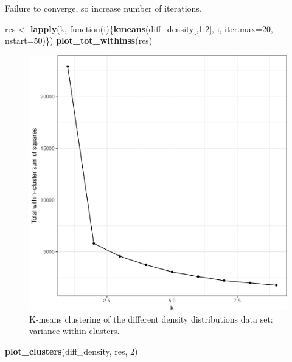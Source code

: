 \documentclass[]{book}
\newenvironment{Shaded}{\begin{snugshade}}{\end{snugshade}}
\newcommand{\KeywordTok}[1]{\textcolor[rgb]{0.13,0.29,0.53}{\textbf{{#1}}}}
\newcommand{\DataTypeTok}[1]{\textcolor[rgb]{0.13,0.29,0.53}{{#1}}}
\newcommand{\DecValTok}[1]{\textcolor[rgb]{0.00,0.00,0.81}{{#1}}}
\newcommand{\StringTok}[1]{\textcolor[rgb]{0.31,0.60,0.02}{{#1}}}
\newcommand{\NormalTok}[1]{{#1}}
\theoremstyle{definition}
\theoremstyle{definition}
\theoremstyle{definition}
\theoremstyle{remark}
\begin{document}
Failure to converge, so increase number of iterations.

\begin{Shaded}
\begin{Highlighting}[]
\NormalTok{res <-}\StringTok{ }\KeywordTok{lapply}\NormalTok{(k, function(i)\{}\KeywordTok{kmeans}\NormalTok{(diff_density[,}\DecValTok{1}\NormalTok{:}\DecValTok{2}\NormalTok{], i, }\DataTypeTok{iter.max=}\DecValTok{20}\NormalTok{, }\DataTypeTok{nstart=}\DecValTok{50}\NormalTok{)\})}
\KeywordTok{plot_tot_withinss}\NormalTok{(res)}
\end{Highlighting}
\end{Shaded}

\begin{figure}

{\centering \includegraphics[width=0.5\linewidth]{09-clustering_files/figure-latex/kmeansDiffDensityElbow-1} 

}

\caption{K-means clustering of the different density distributions data set: variance within clusters.}\label{fig:kmeansDiffDensityElbow}
\end{figure}

\begin{Shaded}
\begin{Highlighting}[]
\KeywordTok{plot_clusters}\NormalTok{(diff_density, res, }\DecValTok{2}\NormalTok{)}
\end{Highlighting}
\end{Shaded}
\end{document}

